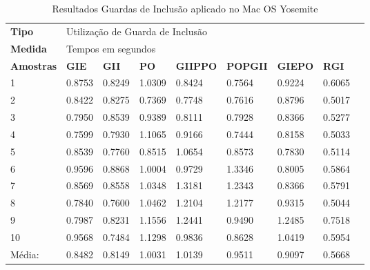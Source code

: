 \begin{table}[!ht]
\centering
\caption{Resultados Guardas de Inclusão aplicado no Mac OS Yosemite}
\label{tab:resutados_guards_de_inclusao:mac}
\begin{tiny}
\begin{tabular}{lp{1cm}p{1cm}p{1cm}p{1cm}p{1cm}p{1cm}p{1cm}p{1cm}}
\textbf{Tipo} & \multicolumn{7}{l}{Utilização de Guarda de Inclusão} \\
\textbf{Medida} & \multicolumn{7}{l}{Tempos em segundos } \\
\textbf{Amostras} & \textbf{GIE} & \textbf{GII} & \textbf{PO} & 
\textbf{GIIPPO} & \textbf{POPGII} & \textbf{GIEPO} & \textbf{RGI} \\ \toprule
 1      & 0.8753 & 0.8249 & 1.0309  & 0.8424  & 0.7564  & 0.9224  & 0.6065  \\ 
 2      & 0.8422 & 0.8275 & 0.7369  & 0.7748  & 0.7616  & 0.8796  & 0.5017  \\ 
 3      & 0.7950 & 0.8539 & 0.9389  & 0.8111  & 0.7928  & 0.8366  & 0.5277  \\ 
 4      & 0.7599 & 0.7930 & 1.1065  & 0.9166  & 0.7444  & 0.8158  & 0.5033  \\ 
 5      & 0.8539 & 0.7760 & 0.8515  & 1.0654  & 0.8573  & 0.7830  & 0.5114  \\ 
 6      & 0.9596 & 0.8868 & 1.0004  & 0.9729  & 1.3346  & 0.8005  & 0.5864  \\ 
 7      & 0.8569 & 0.8558 & 1.0348  & 1.3181  & 1.2343  & 0.8366  & 0.5791  \\ 
 8      & 0.7840 & 0.7600 & 1.0462  & 1.2104  & 1.2177  & 0.9315  & 0.5044  \\ 
 9      & 0.7987 & 0.8231 & 1.1556  & 1.2441  & 0.9490  & 1.2485  & 0.7518  \\ 
 10     & 0.9568 & 0.7484 & 1.1298  & 0.9836  & 0.8628  & 1.0419  & 0.5954  \\ \bottomrule
 Média: & 0.8482 & 0.8149 & 1.0031  & 1.0139  & 0.9511  & 0.9097  & 0.5668  \\ 
\end{tabular}
\end{tiny}
\end{table}

